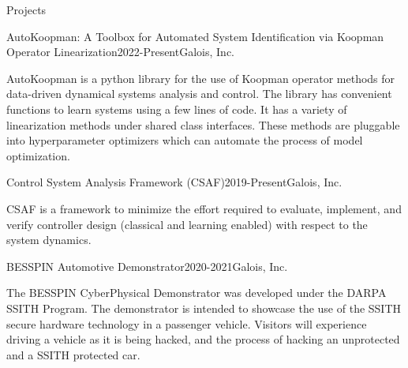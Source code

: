 \documentclass{resume}
\begin{document}
\begin{rSection}{Projects}

\begin{rSubsection}{AutoKoopman: A Toolbox for Automated System Identification via Koopman Operator Linearization}{2022-Present}{}{Galois, Inc.}
\item AutoKoopman is a python library for the use of Koopman operator methods for data-driven dynamical systems analysis and control. The library has convenient functions to learn systems using a few lines of code. It has a variety of linearization methods under shared class interfaces. These methods are pluggable into hyperparameter optimizers which can automate the process of model optimization.
\end{rSubsection}

\begin{rSubsection}{Control System Analysis Framework (CSAF)}{2019-Present}{}{Galois, Inc.}
\item CSAF is a framework to minimize the effort required to evaluate, implement, and verify controller design (classical and learning enabled) with respect to the system dynamics.
\end{rSubsection}

\begin{rSubsection}{BESSPIN Automotive Demonstrator}{2020-2021}{}{Galois, Inc.}
\item The BESSPIN CyberPhysical Demonstrator was developed under the DARPA SSITH Program. The demonstrator is intended to showcase the use of the SSITH secure hardware technology in a passenger vehicle. Visitors will experience driving a vehicle as it is being hacked, and the process of hacking an unprotected and a SSITH protected car. 
\end{rSubsection}

\end{rSection}


\end{document}
